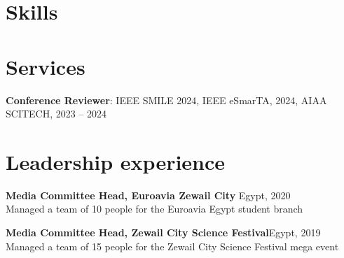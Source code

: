 \documentclass[10pt]{article}
\begin{document}
\section{Skills}\label{sec:skills}



\section{Services}\label{sec:services}
\textbf{Conference Reviewer}: IEEE SMILE 2024, IEEE eSmarTA, 2024, AIAA SCITECH, 2023 – 2024

\section{Leadership experience}\label{sec:leadership-experience}
\textbf{Media Committee Head, Euroavia Zewail City} \hfill Egypt, 2020\\
Managed a team of 10 people for the Euroavia Egypt student branch

\textbf{Media Committee Head, Zewail City Science Festival}\hfill Egypt, 2019\\
Managed a team of 15 people for the Zewail City Science Festival mega event
\end{document}
